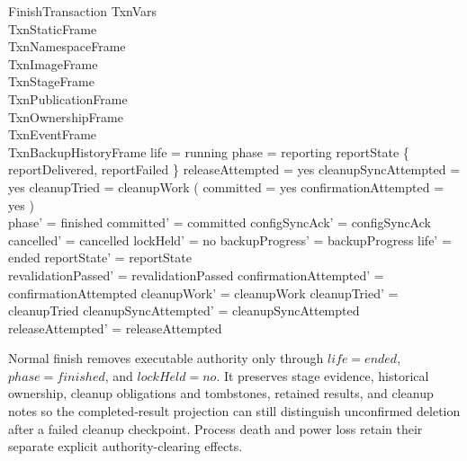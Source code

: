 \documentclass{article}
\begin{document}
\begin{schema}{FinishTransaction}
	\Delta TxnVars \\
	TxnStaticFrame \\
	TxnNamespaceFrame \\
	TxnImageFrame \\
	TxnStageFrame \\
	TxnPublicationFrame \\
	TxnOwnershipFrame \\
	TxnEventFrame \\
	TxnBackupHistoryFrame
	\where
	life = running \land phase = reporting \land
	reportState \in \{ reportDelivered, reportFailed \} \land
	releaseAttempted = yes \land cleanupSyncAttempted = yes \land
	cleanupTried = \dom cleanupWork \land
	( committed = yes \implies confirmationAttempted = yes ) \\
	phase' = finished \land committed' = committed \land
	configSyncAck' = configSyncAck \land cancelled' = cancelled \land
	lockHeld' = no \land backupProgress' = backupProgress \land
	life' = ended \land reportState' = reportState \\
	revalidationPassed' = revalidationPassed \land
	confirmationAttempted' = confirmationAttempted \land
	cleanupWork' = cleanupWork \land cleanupTried' = cleanupTried \land
	cleanupSyncAttempted' = cleanupSyncAttempted \land releaseAttempted' = releaseAttempted
\end{schema}

Normal finish removes executable authority only through $life=ended$,
$phase=finished$, and $lockHeld=no$.  It preserves stage evidence, historical
ownership, cleanup obligations and tombstones, retained results, and cleanup
notes so the completed-result projection can still distinguish unconfirmed
deletion after a failed cleanup checkpoint.  Process death and power loss retain
their separate explicit authority-clearing effects.
\end{document}

